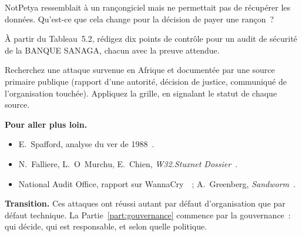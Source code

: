 \begin{boxexo}[title={\ding{45}\quad Exercice~5.8. Rançongiciel ou destructeur \niveaumoyen}]
NotPetya ressemblait à un rançongiciel mais ne permettait pas de
récupérer les données. Qu'est-ce que cela change pour la décision de payer
une rançon~?
\end{boxexo}

\begin{boxexo}[title={\ding{45}\quad Exercice~5.9. Des points de contrôle \niveauexpert}]
À partir du Tableau~5.2, rédigez dix points de contrôle pour un audit de
sécurité de la BANQUE SANAGA, chacun avec la preuve attendue.
\end{boxexo}

\begin{boxexo}[title={\ding{45}\quad Exercice~5.10. Une affaire africaine \niveauexpert}]
Recherchez une attaque survenue en Afrique et documentée par une source
primaire publique (rapport d'une autorité, décision de justice,
communiqué de l'organisation touchée). Appliquez la grille, en signalant
le statut de chaque source.
\end{boxexo}

\bigskip

\begin{boxinfo}
\textbf{Pour aller plus loin.}
\begin{itemize}
    \item E.~Spafford, analyse du ver de 1988~\cite{spafford1989}.
    \item N.~Falliere, L.~O~Murchu, E.~Chien, \emph{W32.Stuxnet
          Dossier}~\cite{falliere2011}.
    \item National Audit Office, rapport sur WannaCry~\cite{nao2017wannacry}~;
          A.~Greenberg, \emph{Sandworm}~\cite{greenberg2019}.
\end{itemize}
\end{boxinfo}

\begin{boxinfo}
\textbf{Transition.} Ces attaques ont réussi autant par défaut
d'organisation que par défaut technique. La Partie~\ref{part:gouvernance}
commence par la gouvernance~: qui décide, qui est responsable, et selon
quelle politique.
\end{boxinfo}
